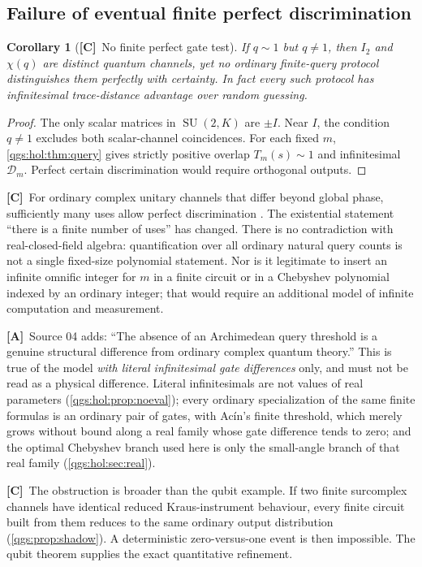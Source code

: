 \documentclass[11pt,oneside]{article}
\numberwithin{equation}{section}
\theoremstyle{plain}
\newtheorem{corollary}[corollary]{Corollary}
\theoremstyle{definition}
\theoremstyle{remark}
\newcommand{\TD}{\mathcal D}
\DeclareMathOperator{\SU}{SU}
\newcommand{\TC}{\textcolor{TierC}{\textsf{\bfseries[C]}}}
\newcommand{\TA}{\textcolor{TierA}{\textsf{\bfseries[A]}}}
\begin{document}
\subsection{Failure of eventual finite perfect discrimination}
\begin{corollary}[\TC\ No finite perfect gate test]\label{qgs:hol:cor:nofinite}
If $q\sim1$ but $q\neq1$, then $I_2$ and $\chi(q)$ are distinct quantum channels, yet no ordinary finite-query protocol distinguishes them perfectly with certainty. In fact every such protocol has infinitesimal trace-distance advantage over random guessing.
\end{corollary}
\begin{proof}
The only scalar matrices in $\SU(2,K)$ are $\pm I$. Near $I$, the condition $q\neq1$ excludes both scalar-channel coincidences. For each fixed $m$, \cref{qgs:hol:thm:query} gives strictly positive overlap $T_m(s)\sim1$ and infinitesimal $\TD_m$. Perfect certain discrimination would require orthogonal outputs.
\end{proof}

\TC\ For ordinary complex unitary channels that differ beyond global phase, sufficiently many uses allow perfect discrimination \cite{Acin}. The existential statement ``there is a finite number of uses'' has changed. There is no contradiction with real-closed-field algebra: quantification over all ordinary natural query counts is not a single fixed-size polynomial statement. Nor is it legitimate to insert an infinite omnific integer for $m$ in a finite circuit or in a Chebyshev polynomial indexed by an ordinary integer; that would require an additional model of infinite computation and measurement.

\TA\ Source 04 adds: ``The absence of an Archimedean query threshold is a genuine structural difference from ordinary complex quantum theory.'' This is true of the model \emph{with literal infinitesimal gate differences} only, and must not be read as a physical difference. Literal infinitesimals are not values of real parameters (\cref{qgs:hol:prop:noeval}); every ordinary specialization of the same finite formulas is an ordinary pair of gates, with Ac\'in's finite threshold, which merely grows without bound along a real family whose gate difference tends to zero; and the optimal Chebyshev branch used here is only the small-angle branch of that real family (\cref{qgs:hol:sec:real}).

\TC\ The obstruction is broader than the qubit example. If two finite surcomplex channels have identical reduced Kraus-instrument behaviour, every finite circuit built from them reduces to the same ordinary output distribution (\cref{qgs:prop:shadow}). A deterministic zero-versus-one event is then impossible. The qubit theorem supplies the exact quantitative refinement.
\end{document}

